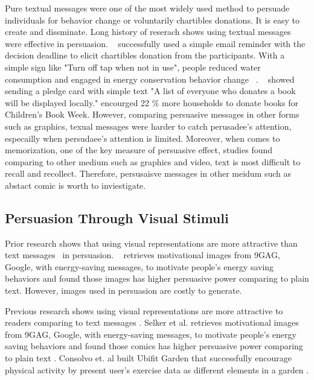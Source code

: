 Pure textual messages were one of the most widely used method to persuade individuals for behavior change or voluntarily chartibles donations. It is easy to create and dissminate. Long history of reserach shows using textual messages were effective in persuasion. ~\textcite{damgaard2017now} successfully used a simple email reminder with the decision deadline to elicit chartibles donation from the participants. With a simple sign like "Turn off tap when not in use", people reduced water consumption and engaged in energy conservation behavior change ~\cite{mckenzie2011fostering}. ~\textcite{cotterill2010impact} showed sending a pledge card with simple text "A list of everyone who donates a book will be displayed locally." encourged 22 \% more households to donate books for Children's Book Week. However, comparing persuasive messages in other forms such as graphics, texual messages were harder to catch perusadee's attention, especailly when persudaee's attention is limited. Moreover, when comes to memorization, one of the key measure of persuasive effect, studies found comparing to other medium such as graphics and video, text is most difficult to recall and recollect. Therefore, persusaisve messages in other meidum such as abstact comic is worth to inviestigate. 

\subsection{Persuasion Through Visual Stimuli}
Prior research shows that using visual representations are more attractive than text messages~\cite{selker2015sweetbuildinggreeter,consolvo2008activity} in persuasion. ~\textcite{selker2015sweetbuildinggreeter} retrieves motivational images from 9GAG, Google, with energy-saving messages, to motivate people's energy saving behaviors and found those images has higher persuasive power comparing to plain text. However, images used in persuasion are costly to generate. 


Previous research shows using visual representations are more attractive to readers comparing to text messages \cite{selker2015sweetbuildinggreeter,consolvo2008activity}. Selker et al. retrieves motivational images from 9GAG, Google, with energy-saving messages, to motivate people's energy saving behaviors and found those comics has higher persuasive power comparing to plain text \cite{selker2015sweetbuildinggreeter}. Consolvo et. al built Ubifit Garden that successfully encourage physical activity by present user's exercise data as different elements in a garden \cite{consolvo2008activity}.


